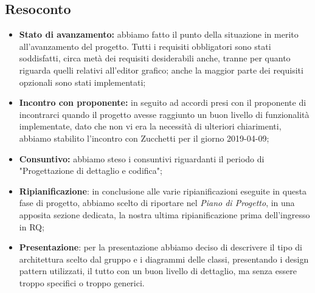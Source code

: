 \subsection{Resoconto}
\begin{itemize}
	\item {\textbf{Stato di avanzamento:} abbiamo fatto il punto della situazione in merito all'avanzamento del progetto. Tutti i requisiti obbligatori sono stati soddisfatti, circa metà dei requisiti desiderabili anche, tranne per quanto riguarda quelli relativi all'editor grafico; anche la maggior parte dei requisiti opzionali sono stati implementati;}
	\item {\textbf{Incontro con proponente:} in seguito ad accordi presi con il proponente di incontrarci quando il progetto avesse raggiunto un buon livello di funzionalità implementate, dato che non vi era la necessità di ulteriori chiarimenti, abbiamo stabilito l'incontro con Zucchetti per il giorno 2019-04-09;}
	\item {\textbf{Consuntivo:} abbiamo steso i consuntivi riguardanti il periodo di "Progettazione di dettaglio e codifica";}
	\item { \textbf{Ripianificazione}: in conclusione alle varie ripianificazioni eseguite in questa fase di progetto, abbiamo scelto di riportare nel \emph{Piano di Progetto}, in una apposita sezione dedicata, la nostra ultima ripianificazione prima dell'ingresso in RQ;}
	\item { \textbf{Presentazione}: per la presentazione abbiamo deciso di descrivere il tipo di architettura scelto dal gruppo e i diagrammi delle classi, presentando i design pattern utilizzati, il tutto con un buon livello di dettaglio, ma senza essere troppo specifici o troppo generici.}
\end{itemize}

